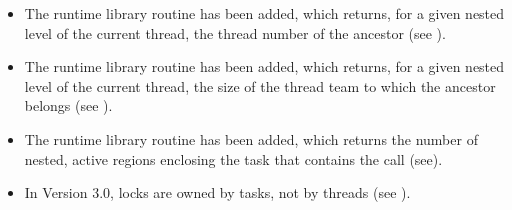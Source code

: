 \begin{itemize}
\item The  runtime library routine has been added,
which returns, for a given nested level of the current thread, the thread number of the
ancestor (see
).

\item The  runtime library routine has been added, which returns,
for a given nested level of the current thread, the size of the thread team to which the
ancestor belongs (see
).

\item The  runtime library routine has been added, which
returns the number of nested, active  regions enclosing the task that
contains the call (see\linebreak {}).

\item In Version 3.0, locks are owned by tasks, not by threads (see
).
\end{itemize}



